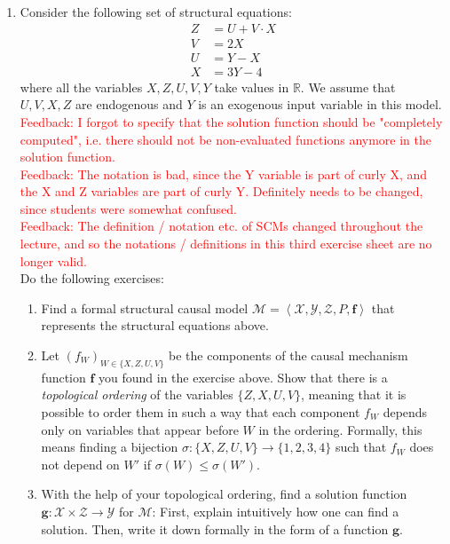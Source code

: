 \begin{enumerate}
\item Consider the following set of structural equations:
\begin{align}
	Z & = U + V \cdot X \\
	V & = 2 X \\
	U & = Y - X \\
	X & = 3 Y - 4
	\label{eq:acyclic_structural_equations}
\end{align}
where all the variables $X, Z, U, V, Y$ take values in $\mathbb{R}$.
We assume that $U,V,X,Z$ are endogenous and $Y$ is an exogenous input variable in this model.\\
\textcolor{red}{Feedback: I forgot to specify that the solution function should be "completely computed", i.e. there should not be non-evaluated functions anymore in the solution function.}\\
\textcolor{red}{Feedback: The notation is bad, since the Y variable is part of curly X, and the X and Z variables are part of curly Y. Definitely needs to be changed, since students were somewhat confused.}\\
\textcolor{red}{Feedback: The definition / notation etc. of SCMs changed throughout the lecture, and so the notations / definitions in this third exercise sheet are no longer valid.}\\
Do the following exercises:
\begin{enumerate}
	\item Find a formal structural causal model $\mathcal{M} = \left\langle \boldsymbol{\mathcal{X}}, \boldsymbol{\mathcal{Y}}, \boldsymbol{\mathcal{Z}}, P, \boldsymbol{f}\right\rangle$ that represents the structural equations above.
	\item Let $(f_W)_{W \in \{X,Z,U,V\}}$ be the components of the causal mechanism function $\boldsymbol{f}$ you found in the exercise above.
	Show that there is a \emph{topological ordering} of the variables $\{Z,X,U,V\}$, meaning that it is possible to order them in such a way that each component $f_W$ depends only on variables that appear before $W$ in the ordering.
	Formally, this means finding a bijection $\sigma: \{X, Z, U, V\} \to \{1, 2, 3, 4\}$ such that $f_{W}$ does not depend on $W'$ if $\sigma(W) \leq \sigma(W')$. 
	\item With the help of your topological ordering, find a solution function $\boldsymbol{g}: \boldsymbol{\mathcal{X}} \times \boldsymbol{\mathcal{Z}} \to \boldsymbol{\mathcal{Y}}$ for $\mathcal{M}$:
	First, explain intuitively how one can find a solution. Then, write it down formally in the form of a function $\boldsymbol{g}$.

\end{enumerate}
\end{enumerate}
